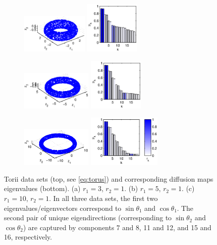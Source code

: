 \documentclass[3p]{elsarticle}
\begin{document}
\begin{figure}[t]
\centering
\begin{subfigure}{1.5in}
\centering
\includegraphics[height=0.75in]{torus1}
\includegraphics[height=1in]{torus1_evals}
\caption{}
\end{subfigure}
%
%
\begin{subfigure}{1.5in}
\centering
\includegraphics[height=0.75in]{torus2}
\includegraphics[height=1in]{torus2_evals}
\caption{}
\end{subfigure}
%
%
\begin{subfigure}{1.5in}
\centering
\includegraphics[height=0.75in]{torus3}
\includegraphics[height=1in]{torus3_evals}
\caption{}
\end{subfigure}
%
\hfill
%
\caption{Torii data sets (top, see \eqref{eq:torus}) and corresponding diffusion maps eigenvalues (bottom). (a) $r_1 = 3$, $r_2 = 1$. (b) $r_1 = 5$, $r_2 = 1$. (c) $r_1 = 10$, $r_2 = 1$. In all three data sets, the first two eigenvalues/eigenvectors correspond to $\sin \theta_1$ and $\cos \theta_1$. The second pair of unique eigendirections (corresponding to $\sin \theta_2$ and $\cos \theta_2$) are captured by components 7 and 8, 11 and 12, and 15 and 16, respectively.}
%
\label{fig:torus}
%
\end{figure}
\end{document}
